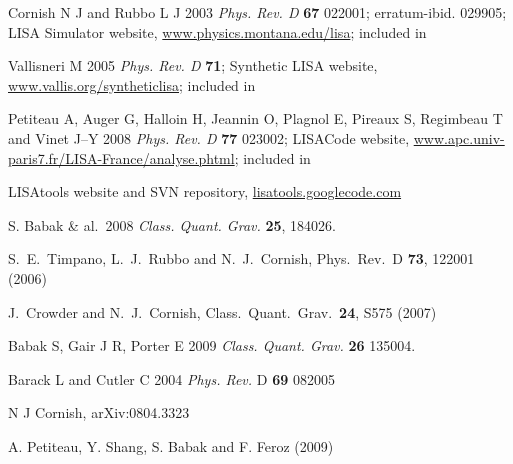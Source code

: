 \documentclass{iopart}
\begin{document}
\begin{thebibliography}{99}

 Cornish N J and Rubbo L J 2003 \emph{Phys. Rev. D} \textbf{67} 022001; erratum-ibid. 029905; LISA Simulator website, \url{www.physics.montana.edu/lisa}; included in \cite{lisatools}

 Vallisneri M 2005 \emph{Phys. Rev. D} \textbf{71}; Synthetic LISA website, \url{www.vallis.org/syntheticlisa}; included in \cite{lisatools}

 Petiteau A, Auger G, Halloin H, Jeannin O, Plagnol E, Pireaux S, Regimbeau T and Vinet J--Y 2008 \emph{Phys. Rev. D} \textbf{77} 023002; LISACode website, \url{www.apc.univ-paris7.fr/LISA-France/analyse.phtml}; included in \cite{lisatools}

 LISAtools website and SVN repository, \url{lisatools.googlecode.com}

S. Babak \& al.~2008 \textit{Class. Quant. Grav.} \textbf{25}, 184026.

  S.~E.~Timpano, L.~J.~Rubbo and N.~J.~Cornish,
  Phys.\ Rev.\  D {\bf 73}, 122001 (2006)

  J.~Crowder and N.~J.~Cornish,
  Class.\ Quant.\ Grav.\  {\bf 24}, S575 (2007)

 Babak S, Gair J R, Porter E 2009 \textit{Class. Quant. Grav.} \textbf{26} 135004.

 Barack L and Cutler C 2004 \textit{Phys. Rev.} D \textbf{69} 082005

 N J Cornish, arXiv:0804.3323

A. Petiteau, Y. Shang, S. Babak and  F. Feroz
 (2009)


\end{thebibliography}
\end{document}
